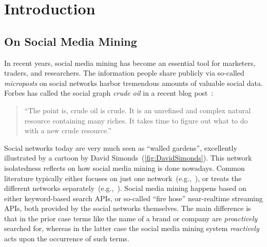 \documentclass{iosart2c}
\begin{document}
\section{Introduction} \label{sec:introduction}
\subsection{On Social Media Mining}
In recent years, social media mining has become an essential tool for marketers, traders, and researchers.
The information people share publicly via so-called \emph{microposts} on social networks harbor tremendous amounts of valuable social data.
Forbes has called the social graph \emph{crude oil} in a recent blog post~\cite{ForbesPost}:
\begin{quotation}
``The point is, crude oil is crude. It is an unrefined and complex natural resource containing many riches. It takes time to figure out what to do with a new crude resource.''
\end{quotation}
Social networks today are very much seen as ``walled gardens'', excellently illustrated by a cartoon by David Simonds~(\autoref{fig:DavidSimonds}).
This network isolatedness reflects on how social media mining is done nowadays.
Common literature typically either focuses on just one network~(e.g.,~\cite{russell201121}), or treats the different networks separately~(e.g.,~\cite{russell2011mining}).
Social media mining happens based on either keyword-based search APIs, or so-called ``fire hose'' near-realtime streaming APIs, both provided by the social networks themselves.
The main difference is that in the prior case terms like the name of a brand or company are \emph{proactively} searched for, whereas in the latter case the social media mining system \emph{reactively} acts upon the occurrence of such terms.
\end{document}
